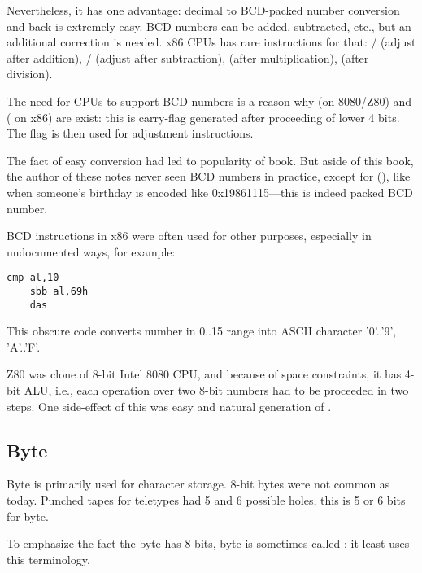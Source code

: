 Nevertheless, it has one advantage: decimal to \ac{BCD}-packed number conversion and back is extremely easy.
BCD-numbers can be added, subtracted, etc., but an additional correction is needed.
x86 CPUs has rare instructions for that:
/ (adjust after addition),
/ (adjust after subtraction),
 (after multiplication),
 (after division).

The need for CPUs to support \ac{BCD} numbers is a reason why  (on 8080/Z80) and
 ( on x86)
are exist: this is carry-flag generated after proceeding of lower 4 bits. The flag is then used for adjustment instructions.

The fact of easy conversion had led to popularity of
 book.
But aside of this book, the author of these notes never seen \ac{BCD} numbers in practice, except for
 (),
like when someone's birthday is encoded like 0x19861115---this is indeed packed \ac{BCD} number.

\ac{BCD} instructions in x86 were often used for other purposes, especially in undocumented ways, for example:

\begin{lstlisting}[style=customasmx86]
	cmp al,10
	sbb al,69h
	das
\end{lstlisting}

This obscure code converts number in 0..15 range into \ac{ASCII} character '0'..'9', 'A'..'F'.


Z80 was clone of 8-bit Intel 8080 CPU, and because of space constraints, it has 4-bit \ac{ALU}, i.e., each operation
over two 8-bit numbers had to be proceeded in two steps.
One side-effect of this was easy and natural generation of .

\subsection{Byte}

Byte is primarily used for character storage.
8-bit bytes were not common as today.
Punched tapes for teletypes had 5 and 6 possible holes, this is 5 or 6 bits for byte.

To emphasize the fact the byte has 8 bits, byte is sometimes called :
it least  uses this terminology.

